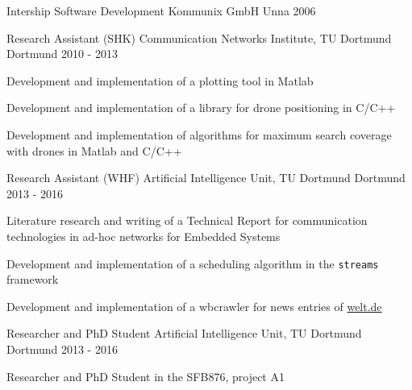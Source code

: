 

\begin{cventries}

  \cventry
    {Intership Software Development} %
    {Kommunix GmbH} %
    {Unna} %
    {2006} %
    {
    }

  \cventry
    {Research Assistant (SHK)} %
    {Communication Networks Institute, TU Dortmund} %
    {Dortmund} %
    {2010 - 2013} %
    {
      \begin{cvitems} %
        \item {Development and implementation of a plotting tool in Matlab }
        \item {Development and implementation of a library for drone positioning in C/C++}
        \item {Development and implementation of algorithms for maximum search coverage with drones in Matlab and C/C++}
      \end{cvitems}
    }

    \cventry
    {Research Assistant (WHF)} %
    {Artificial Intelligence Unit, TU Dortmund} %
    {Dortmund} %
    {2013 - 2016} %
    {
      \begin{cvitems} %
        \item {Literature research and writing of a Technical Report for communication technologies in ad-hoc networks for Embedded Systems}
        \item {Development and implementation of a scheduling algorithm in the \texttt{streams} framework}
        \item {Development and implementation of a wbcrawler for news entries of \url{welt.de}}
      \end{cvitems}
    }

  \cventry
    {Researcher and PhD Student} %
    {Artificial Intelligence Unit, TU Dortmund} %
    {Dortmund} %
    {2013 - 2016} %
    {
      \begin{cvitems} %
        \item {Researcher and PhD Student in the SFB876, project A1}
      \end{cvitems}
    }

\end{cventries}
